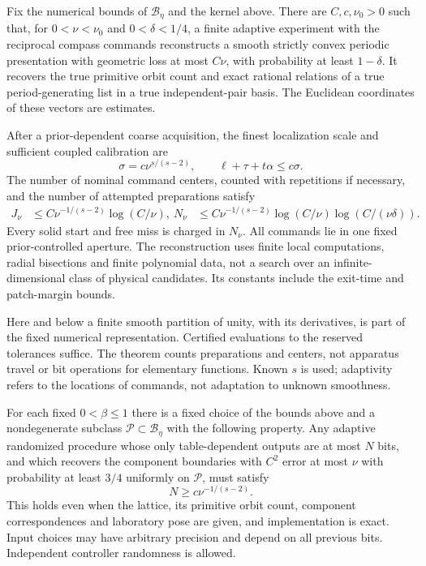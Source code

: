 \begin{theorem}\label{thm:adaptive}
Fix the numerical bounds of $\mathcal B_\eta$ and the kernel above.
There are $C,c,\nu_0>0$ such that, for $0<\nu<\nu_0$ and
$0<\delta<1/4$, a finite adaptive experiment with the reciprocal
compass commands reconstructs a smooth strictly convex periodic
presentation with geometric loss at most $C\nu$, with probability at
least $1-\delta$. It recovers the true primitive orbit count and exact
rational relations of a true period-generating list in a true independent-pair basis. The Euclidean coordinates of these vectors are estimates.

After a prior-dependent coarse acquisition, the finest localization
scale and sufficient coupled calibration are
\begin{equation}\label{eq:precision}
 \sigma=c\nu^{s/(s-2)},\qquad \ell+\tau+t\alpha\le c\sigma.
\end{equation}
The number of nominal command centers, counted with repetitions if
necessary, and the number of attempted preparations satisfy
\begin{align}
 J_\nu&\le C\nu^{-1/(s-2)}\log(C/\nu),\label{eq:centers}\
 N_\nu&\le C\nu^{-1/(s-2)}\log(C/\nu)
                               \log(C/(\nu\delta)).\label{eq:attempts}
\end{align}
Every solid start and free miss is charged in $N_\nu$. All commands lie
in one fixed prior-controlled aperture. The reconstruction uses finite
local computations, radial bisections and finite polynomial data, not
a search over an infinite-dimensional class of physical candidates.
Its constants include the exit-time and patch-margin bounds.
\end{theorem}

Here and below a finite smooth partition of unity, with its derivatives,
is part of the fixed numerical representation. Certified evaluations
to the reserved tolerances suffice. The theorem counts preparations and
centers, not apparatus travel or bit operations for elementary functions.
Known $s$ is used; adaptivity refers to the locations of commands, not
adaptation to unknown smoothness.

\begin{theorem}
\label{thm:lower}
For each fixed $0<\beta\le1$ there is a fixed choice of the bounds
above and a nondegenerate subclass $\mathcal P\subset\mathcal B_\eta$
with the following property. Any adaptive randomized procedure whose
only table-dependent outputs are at most $N$ bits, and which recovers
the component boundaries with $C^2$ error at most $\nu$ with probability
at least $3/4$ uniformly on $\mathcal P$, must satisfy
\begin{equation}\label{eq:lower}
                         N\ge c\nu^{-1/(s-2)}.
\end{equation}
This holds even when the lattice, its primitive orbit count, component
correspondences and laboratory pose are given, and implementation is
exact. Input choices may have arbitrary precision and depend on all
previous bits. Independent controller randomness is allowed.
\end{theorem}

